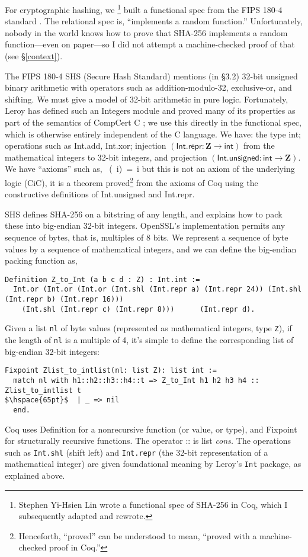 \documentclass[prodmode,acmtoplas]{acmsmall}
\newcommand\blind[2]{#2}
\begin{document}
For cryptographic hashing, we%
\blind{}{\footnote{Stephen Yi-Hsien Lin wrote a functional spec of SHA-256
in Coq, which I subsequently adapted and rewrote.}}
built a functional
spec from the FIPS 180-4 standard \cite{fips180-4}.  The relational
spec is, ``implements a random function.''  Unfortunately,
nobody in the world knows how to prove that SHA-256 implements
a random function---even on paper---so I did not attempt
a machine-checked proof of that (see \S\ref{context}).

The FIPS 180-4 SHS (Secure Hash Standard) 
mentions (in \S 3.2) 32-bit unsigned
binary arithmetic with operators such as addition-modulo-32,
exclusive-or, and shifting.  We must give a model of 32-bit
arithmetic in pure logic.  Fortunately, Leroy has defined
such an \textsf{Integers} module and proved many of its properties
as part of the semantics of CompCert C \cite{leroy09};
we use this directly in the functional spec, which is
otherwise entirely independent of the C language.
We have: the type \textsf{int};
operations such as \textsf{Int.add},
\textsf{Int.xor};
injection $(\mathsf{Int.repr}: \mathbf{Z}\rightarrow \mathsf{int})$ from the mathematical integers
to 32-bit integers, and projection 
$(\mathsf{Int.unsigned}: \mathsf{int}\rightarrow \mathbf{Z})$.
We have ``axioms'' such as,
{~(~i)~=~i}
but this is not an axiom of the underlying logic (CiC),
it is a theorem proved\footnote{Henceforth, ``proved'' can be understood
to mean, ``proved with a machine-checked proof in Coq.''}
from the axioms of Coq using the constructive definitions of 
\textsf{Int.unsigned} and \textsf{Int.repr}.

SHS defines SHA-256 on a bitstring of any length,
and explains how to pack these into big-endian 32-bit integers.
OpenSSL's implementation permits any sequence of
bytes, that is, multiples of 8 bits.  We represent
a sequence of byte values by a sequence of mathematical
integers, and we can define the big-endian packing function as,
\begin{lstlisting}
Definition Z_to_Int (a b c d : Z) : Int.int :=
  Int.or (Int.or (Int.or (Int.shl (Int.repr a) (Int.repr 24)) (Int.shl (Int.repr b) (Int.repr 16)))
    (Int.shl (Int.repr c) (Int.repr 8)))      (Int.repr d).
\end{lstlisting}
Given a list \lstinline{nl} of byte values (represented
as mathematical integers, type \lstinline{Z}),
if the length of \lstinline{nl} is a multiple of
4, it's simple to define the corresponding
list of big-endian 32-bit integers:
\begin{lstlisting}
Fixpoint Zlist_to_intlist(nl: list Z): list int :=
  match nl with h1::h2::h3::h4::t => Z_to_Int h1 h2 h3 h4 :: Zlist_to_intlist t
$\hspace{65pt}$  | _ => nil
  end.
\end{lstlisting}
Coq uses \textsf{Definition} for a nonrecursive function (or value,
or type), and \textsf{Fixpoint} for structurally recursive functions.
The operator \textsf{::} is list \emph{cons.}  The 
operations such as \lstinline{Int.shl} (shift left)
and \lstinline{Int.repr} (the 32-bit representation of a mathematical
integer) are given foundational meaning by Leroy's 
\lstinline{Int} package, as explained above.
\end{document}
